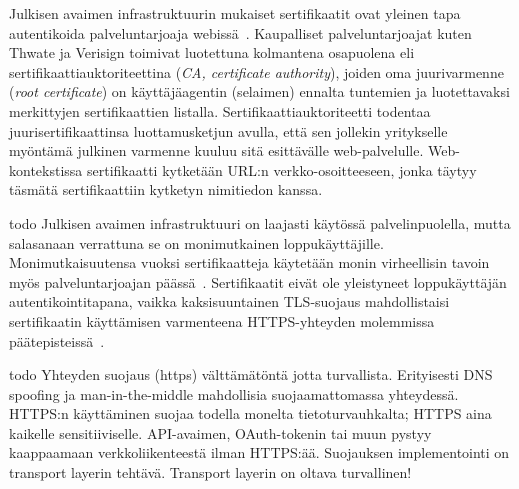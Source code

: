 \documentclass[finnish,gradu]{tktltiki}
\begin{document}
  Julkisen avaimen infrastruktuurin mukaiset sertifikaatit ovat yleinen tapa autentikoida palveluntarjoaja webissä~\cite{id_in_federation_systems_2005}. Kaupalliset palveluntarjoajat kuten Thwate ja Verisign toimivat luotettuna kolmantena osapuolena eli sertifikaattiauktoriteettina (\emph{CA, certificate authority}), joiden oma juurivarmenne (\emph{root certificate}) on käyttäjäagentin (selaimen) ennalta tuntemien ja luotettavaksi merkittyjen sertifikaattien listalla. Sertifikaattiauktoriteetti todentaa juurisertifikaattinsa luottamusketjun avulla, että sen jollekin yritykselle myöntämä julkinen varmenne kuuluu sitä esittävälle web-palvelulle. Web-kontekstissa sertifikaatti kytketään URL:n verkko-osoitteeseen, jonka täytyy täsmätä sertifikaattiin kytketyn nimitiedon kanssa.

  todo
  Julkisen avaimen infrastruktuuri on laajasti käytössä palvelinpuolella, mutta salasanaan verrattuna se on monimutkainen loppukäyttäjille. Monimutkaisuutensa vuoksi sertifikaatteja käytetään monin virheellisin tavoin myös palveluntarjoajan päässä~\cite{eff_ssliverse}. Sertifikaatit eivät ole yleistyneet loppukäyttäjän autentikointitapana, vaikka kaksisuuntainen TLS-suojaus mahdollistaisi sertifikaatin käyttämisen varmenteena HTTPS-yhteyden molemmissa päätepisteissä~\cite{henry_story_foaf_ssl, webid_home}.

  todo
  Yhteyden suojaus (https) välttämätöntä jotta turvallista. Erityisesti DNS spoofing ja man-in-the-middle mahdollisia suojaamattomassa yhteydessä.
  HTTPS:n käyttäminen suojaa todella monelta tietoturvauhkalta;
  HTTPS aina kaikelle sensitiiviselle. API-avaimen, OAuth-tokenin tai muun pystyy kaappaamaan verkkoliikenteestä ilman HTTPS:ää.  Suojauksen implementointi on transport layerin tehtävä. Transport layerin on oltava turvallinen!

\end{document}
